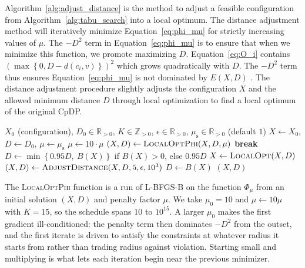 \documentclass[preprint,12pt]{elsarticle}
\theoremstyle{remark}
\def \Z {\mathbb{Z}}
\def \R {\mathbb{R}}
\newcommand{\set}[1]{\left\{ #1 \right\}}
\begin{document}
Algorithm~\ref{alg:adjust_distance} is the method to adjust a feasible
configuration from Algorithm~\ref{alg:tabu_search} into a local optimum. The
distance adjustment method will iteratively minimize Equation~\ref{eq:phi_mu}
for strictly increasing values of $\mu$. The $-D^2$ term in
Equation~\ref{eq:phi_mu} is to ensure that when we minimize this function, we
promote maximizing $D$. Equation~\ref{eq:O_i} contains $(\max\set{0, D - d(c_i,
v)})^2$ which grows quadratically with $D$. The $-D^2$ term thus ensures
Equation~\ref{eq:phi_mu} is not dominated by $E(X, D)$ \citep{lai2024}. The
distance adjustment procedure slightly adjusts the configuration $X$ and the
allowed minimum distance $D$ through local optimization to find a local optimum
of the original CpDP.

\begin{algorithm}[H]
  \caption{Adjust Distance}
  \begin{algorithmic}[1]
    \Require $X_0$ (configuration), $D_0 \in \R_{> 0}$, $K \in \Z_{> 0}$,
    $\epsilon \in \R_{>0}$, $\mu_{\mathrm{s}} \in \R_{>0}$ (default $1$)
    \State $X \gets X_0$, $D \gets D_0$, $\mu \gets \mu_{\mathrm{s}}$
    \State $\mu \gets 10 \cdot \mu$
    \State $(X, D) \gets \textsc{LocalOptPhi}(X, D, \mu)$
    \State \textbf{break}
    \EndIf
    \EndFor
    \State $D \gets \min \set{0.95 D,\ B(X)}$ if $B(X) > 0$, else $0.95 D$
    \State $X \gets \textsc{LocalOpt}(X, D)$
    \State $(X, D) \gets \textsc{AdjustDistance}(X, D, 5, \epsilon, 10^3)$
    \EndIf
    \State $D \gets B(X)$
    \EndIf
    \State \Return $(X, D)$
  \end{algorithmic}
  \label{alg:adjust_distance}
\end{algorithm}

The \textsc{LocalOptPhi} function is a run of L-BFGS-B on the function
$\Phi_\mu$ from an initial solution $(X, D)$ and penalty factor $\mu$. We take
$\mu_0 = 10$ and $\mu \gets 10 \mu$ with $K = 15$, so the schedule spans $10$ to
$10^{15}$. A larger $\mu_0$ makes the first gradient ill-conditioned: the
penalty term then dominates $-D^2$ from the outset, and the first iterate is
driven to satisfy the constraints at whatever radius it starts from rather than
trading radius against violation. Starting small and multiplying is what lets
each iteration begin near the previous minimizer.
\end{document}
